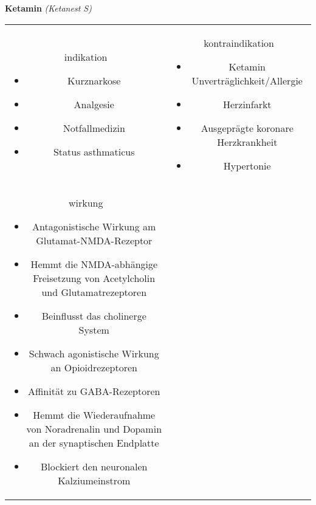 \begin{frame}{
    \textbf{Ketamin}
    \textit{(Ketanest S)}
}
    \begin{tabular}{c c}
        \begin{beamercolorbox}[wd=\boxwidth\textwidth,ht=\boxheight\textheight,sep=1em]{indikation}
            \begin{itemize}
                \item Kurznarkose
                \item Analgesie
                \item Notfallmedizin
                \item Status asthmaticus	
            \end{itemize}
        \end{beamercolorbox} & 
        \begin{beamercolorbox}[wd=\boxwidth\textwidth,ht=\boxheight\textheight,sep=1em]{kontraindikation}
            \begin{itemize}
                \item Ketamin Unverträglichkeit/Allergie
                \item Herzinfarkt
                \item Ausgeprägte koronare Herzkrankheit
                \item Hypertonie
            \end{itemize}
        \end{beamercolorbox} \\
        \begin{beamercolorbox}[wd=\boxwidth\textwidth,ht=\boxheight\textheight,sep=1em]{wirkung}
            \tiny
            \begin{itemize}
                \item Antagonistische Wirkung am Glutamat-NMDA-Rezeptor
                \item Hemmt die NMDA-abhängige Freisetzung von Acetylcholin und Glutamatrezeptoren
                \item Beinflusst das cholinerge System
                \item Schwach agonistische Wirkung an Opioidrezeptoren
                \item Affinität zu GABA-Rezeptoren
                \item Hemmt die Wiederaufnahme von Noradrenalin und Dopamin an der synaptischen Endplatte
                \item Blockiert den neuronalen Kalziumeinstrom
            \end{itemize}

\end{beamercolorbox}
\end{tabular}
\end{frame}
